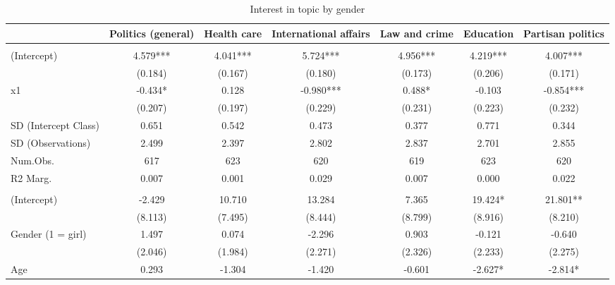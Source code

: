 \documentclass[
  letterpaper,
  DIV=11,
  numbers=noendperiod]{scrreprt}
\begin{document}
\begin{table}

\caption{Interest in topic by gender }
\centering
\fontsize{6}{8}\selectfont
\begin{tabular}[t]{lcccccc}
\toprule
  & Politics (general) & Health care & International affairs & Law and crime & Education & Partisan politics\\
\midrule
\addlinespace[0.5em]
\multicolumn{7}{l}{\textit{Without Controls}}\\
\midrule \hspace{1em}(Intercept) & 4.579*** & 4.041*** & 5.724*** & 4.956*** & 4.219*** & 4.007***\\
\hspace{1em} & (0.184) & (0.167) & (0.180) & (0.173) & (0.206) & (0.171)\\
\hspace{1em}x1 & -0.434* & 0.128 & -0.980*** & 0.488* & -0.103 & -0.854***\\
\hspace{1em} & (0.207) & (0.197) & (0.229) & (0.231) & (0.223) & (0.232)\\
\hspace{1em}SD (Intercept Class) & 0.651 & 0.542 & 0.473 & 0.377 & 0.771 & 0.344\\
\hspace{1em}SD (Observations) & 2.499 & 2.397 & 2.802 & 2.837 & 2.701 & 2.855\\
\hspace{1em}Num.Obs. & 617 & 623 & 620 & 619 & 623 & 620\\
\hspace{1em}R2 Marg. & 0.007 & 0.001 & 0.029 & 0.007 & 0.000 & 0.022\\
\addlinespace[0.5em]
\multicolumn{7}{l}{\textit{With Controls}}\\
\midrule \hspace{1em}(Intercept) & -2.429 & 10.710 & 13.284 & 7.365 & 19.424* & 21.801**\\
\hspace{1em} & (8.113) & (7.495) & (8.444) & (8.799) & (8.916) & (8.210)\\
\hspace{1em}Gender (1 = girl) & 1.497 & 0.074 & -2.296 & 0.903 & -0.121 & -0.640\\
\hspace{1em} & (2.046) & (1.984) & (2.271) & (2.326) & (2.233) & (2.275)\\
\hspace{1em}Age & 0.293 & -1.304 & -1.420 & -0.601 & -2.627* & -2.814*\\

\end{tabular}
\end{table}
\end{document}
